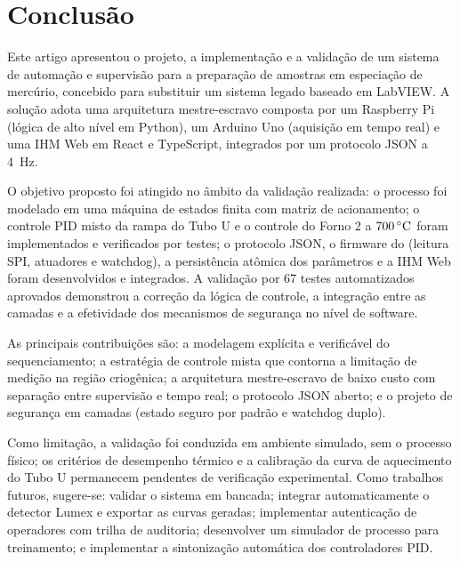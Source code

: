 \section{Conclus\~ao}
\label{sec:concl}

Este artigo apresentou o projeto, a implementa\c{c}\~ao e a valida\c{c}\~ao de um
sistema de automa\c{c}\~ao e supervis\~ao para a prepara\c{c}\~ao de amostras em
especia\c{c}\~ao de merc\'urio, concebido para substituir um sistema legado
baseado em LabVIEW. A solu\c{c}\~ao adota uma arquitetura mestre-escravo composta
por um Raspberry Pi (l\'ogica de alto n\'ivel em Python), um Arduino Uno
(aquisi\c{c}\~ao em tempo real) e uma IHM Web em React e TypeScript, integrados por
um protocolo JSON a 4~Hz.

O objetivo proposto foi atingido no \^ambito da valida\c{c}\~ao realizada: o
processo foi modelado em uma m\'aquina de estados finita com matriz de
acionamento; o controle PID misto da rampa do Tubo U e o controle do Forno 2 a
$700\,\celsius$ foram implementados e verificados por testes; o protocolo JSON, o
firmware do \daq (leitura SPI, atuadores e watchdog), a persist\^encia at\^omica
dos par\^ametros e a IHM Web foram desenvolvidos e integrados. A valida\c{c}\~ao
por 67 testes automatizados aprovados demonstrou a corre\c{c}\~ao da l\'ogica de
controle, a integra\c{c}\~ao entre as camadas e a efetividade dos mecanismos de
seguran\c{c}a no n\'ivel de software.

As principais contribui\c{c}\~oes s\~ao: a modelagem expl\'icita e verific\'avel do
sequenciamento; a estrat\'egia de controle mista que contorna a limita\c{c}\~ao de
medi\c{c}\~ao na regi\~ao criog\^enica; a arquitetura mestre-escravo de baixo
custo com separa\c{c}\~ao entre supervis\~ao e tempo real; o protocolo JSON aberto;
e o projeto de seguran\c{c}a em camadas (estado seguro por padr\~ao e watchdog
duplo).

Como limita\c{c}\~ao, a valida\c{c}\~ao foi conduzida em ambiente simulado, sem o
processo f\'isico; os crit\'erios de desempenho t\'ermico e a calibra\c{c}\~ao da
curva de aquecimento do Tubo U permanecem pendentes de verifica\c{c}\~ao
experimental. Como trabalhos futuros, sugere-se: validar o sistema em bancada;
integrar automaticamente o detector Lumex e exportar as curvas geradas;
implementar autentica\c{c}\~ao de operadores com trilha de auditoria;
desenvolver um simulador de processo para treinamento; e implementar a
sintoniza\c{c}\~ao autom\'atica dos controladores PID.

